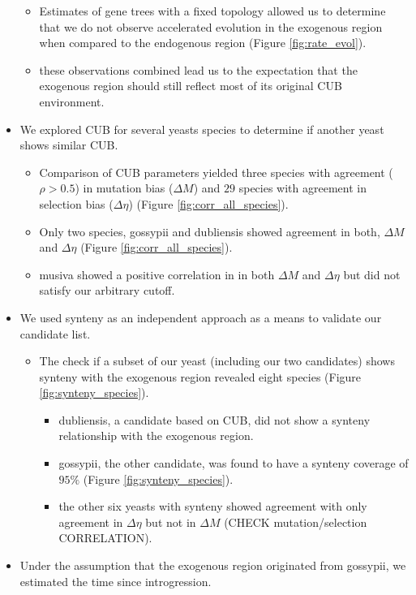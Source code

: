 \documentclass[12pt]{article}
\begin{document}
\begin{itemize}
\begin{itemize}
\begin{itemize}
		\end{itemize}
		\item Estimates of gene trees with a fixed topology allowed us to determine that we do not observe accelerated evolution in the exogenous region when compared to the endogenous region (Figure \ref{fig:rate_evol}).
		\item these observations combined lead us to the expectation that the exogenous region should still reflect most of its original CUB environment.
	\end{itemize}
	\item We explored CUB for several yeasts species to determine if another yeast shows similar CUB.
	\begin{itemize}
		\item Comparison of CUB parameters yielded three species with agreement ($\rho > 0.5$) in mutation bias ($\Delta M$) and $29$ species with agreement in selection bias ($\Delta \eta$) (Figure \ref{fig:corr_all_species}).
		\item Only two species, gossypii and dubliensis showed agreement in both, $\Delta M$ and $\Delta \eta$ (Figure \ref{fig:corr_all_species}).
		\item musiva showed a positive correlation in in both $\Delta M$ and $\Delta \eta$ but did not satisfy our arbitrary cutoff.
	\end{itemize}
	\item We used synteny as an independent approach as a means to validate our candidate list.
	\begin{itemize}
	\item The check if a subset of our yeast (including our two candidates) shows synteny with the exogenous region revealed eight species (Figure \ref{fig:synteny_species}).
		\begin{itemize}
			\item dubliensis, a candidate based on CUB, did not show a synteny relationship with the exogenous region.
			\item gossypii, the other candidate, was found to have a synteny coverage of $95 \%$ (Figure \ref{fig:synteny_species}).
			\item the other six yeasts with synteny showed agreement with only agreement in $\Delta \eta$ but not in $\Delta M$ (CHECK mutation/selection CORRELATION).
		\end{itemize}	 
	\end{itemize}
	\item Under the assumption that the exogenous region originated from gossypii, we estimated the time since introgression.

\end{itemize}
\end{document}
